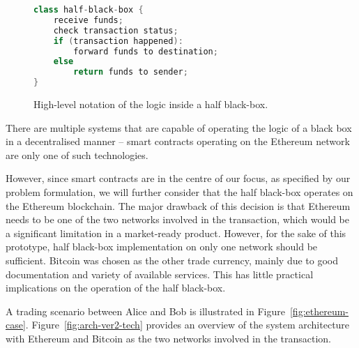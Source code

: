 \begin{figure}[ht]
    \begin{framed}
    \begin{lstlisting}[language=java]
class half-black-box {
	receive funds;
	check transaction status;
	if (transaction happened):
		forward funds to destination;
	else
		return funds to sender;
}
    \end{lstlisting}
    \end{framed}
    \caption{High-level notation of the logic inside a half black-box.}
    \label{fig:simple-logic}
\end{figure}

There are multiple systems that are capable of operating the logic of a black box in a decentralised manner -- smart contracts operating on the Ethereum network are only one of such technologies. 

However, since smart contracts are in the centre of our focus, as specified by our problem formulation, we will further consider that the half black-box operates on the Ethereum blockchain. The major drawback of this decision is that Ethereum needs to be one of the two networks involved in the transaction, which would be a significant limitation in a market-ready product. However, for the sake of this prototype, half black-box implementation on only one network should be sufficient. Bitcoin was chosen as the other trade currency, mainly due to good documentation and variety of available services. This has little practical implications on the operation of the half black-box.

A trading scenario between Alice and Bob is illustrated in Figure~\ref{fig:ethereum-case}. Figure~\ref{fig:arch-ver2-tech} provides an overview of the system architecture with Ethereum and Bitcoin as the two networks involved in the transaction.

